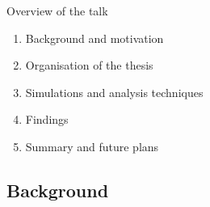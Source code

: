 \documentclass[11pt]{beamer}
\begin{document}
\begin{frame}{Overview of the talk}
\begin{enumerate}
    \item Background and motivation
    \item Organisation of the thesis
    \item Simulations and analysis techniques
    \item Findings
    \item Summary and future plans
\end{enumerate}
\end{frame}

\subsection*{Background}
\end{document}
